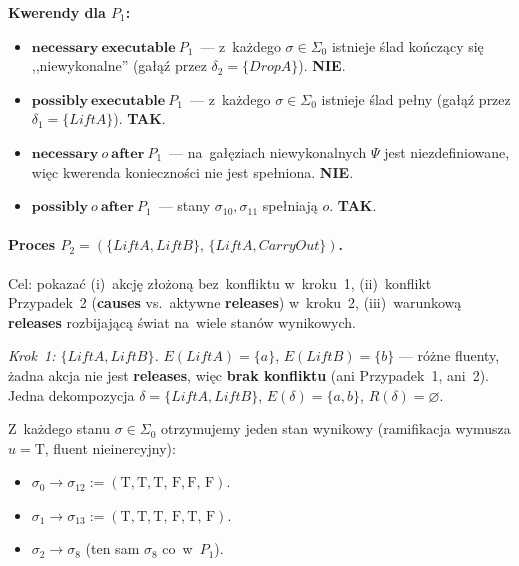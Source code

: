 \documentclass[11pt,a4paper]{article}
\newcommand{\causes}{\textbf{causes}}
\newcommand{\aft}{\textbf{after}}
\newcommand{\releases}{\textbf{releases}}
\newcommand{\necessary}{\textbf{necessary}}
\newcommand{\possibly}{\textbf{possibly}}
\newcommand{\executable}{\textbf{executable}}
\theoremstyle{definition}
\begin{document}
\medskip
\noindent\textbf{Kwerendy dla $P_1$:}
\begin{itemize}
  \item $\necessary\ \executable\ P_1$~---
    z~każdego $\sigma \in \Sigma_0$ istnieje ślad kończący się ,,niewykonalne''
    (gałąź przez $\delta_2 = \{\mathit{DropA}\}$). \textbf{NIE}.

  \item $\possibly\ \executable\ P_1$~---
    z~każdego $\sigma \in \Sigma_0$ istnieje ślad pełny
    (gałąź przez $\delta_1 = \{\mathit{LiftA}\}$). \textbf{TAK}.

  \item $\necessary\ o\ \aft\ P_1$~---
    na~gałęziach niewykonalnych $\Psi$ jest niezdefiniowane, więc kwerenda
    konieczności nie jest spełniona. \textbf{NIE}.

  \item $\possibly\ o\ \aft\ P_1$~---
    stany $\sigma_{10}, \sigma_{11}$ spełniają $o$. \textbf{TAK}.
\end{itemize}

\paragraph{Proces $P_2 = (\{\mathit{LiftA}, \mathit{LiftB}\},\,
\{\mathit{LiftA}, \mathit{CarryOut}\})$.}
Cel: pokazać (i)~akcję złożoną bez~konfliktu w~kroku~1,
(ii)~konflikt Przypadek~2 (\causes{} vs.~aktywne \releases{}) w~kroku~2,
(iii)~warunkową \releases{} rozbijającą świat na~wiele stanów wynikowych.

\medskip
\noindent\textit{Krok~1: $\{\mathit{LiftA}, \mathit{LiftB}\}$.}
$E(\mathit{LiftA}) = \{a\}$, $E(\mathit{LiftB}) = \{b\}$ --- różne fluenty,
żadna akcja nie jest \releases{}, więc \textbf{brak konfliktu} (ani Przypadek~1,
ani~2). Jedna dekompozycja $\delta = \{\mathit{LiftA}, \mathit{LiftB}\}$,
$E(\delta) = \{a, b\}$, $R(\delta) = \varnothing$.

\smallskip
Z~każdego stanu $\sigma \in \Sigma_0$ otrzymujemy jeden stan wynikowy
(ramifikacja wymusza $u = \text{T}$, fluent nieinercyjny):
\begin{itemize}[topsep=2pt]
  \item $\sigma_0 \to \sigma_{12} := (\text{T},\text{T},\text{T},\,\text{F},\text{F},\,\text{F})$.
  \item $\sigma_1 \to \sigma_{13} := (\text{T},\text{T},\text{T},\,\text{F},\text{T},\,\text{F})$.
  \item $\sigma_2 \to \sigma_{8}$ (ten sam $\sigma_8$ co~w~$P_1$).
\end{itemize}
\end{document}
